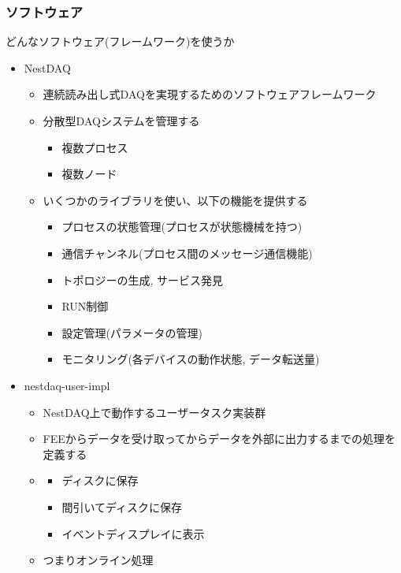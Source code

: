 \documentclass[../main.tex]{subfiles}
\begin{document}
\subsubsection{ソフトウェア}
どんなソフトウェア(フレームワーク)を使うか
\begin{tcolorbox}[
  title=執筆メモ,
  colback=yellow!8,
  colframe=black!30,
  breakable
]
\begin{itemize}
  \item NestDAQ
  \begin{itemize}
    \item 連続読み出し式DAQを実現するためのソフトウェアフレームワーク
    \item 分散型DAQシステムを管理する
    \begin{itemize}
      \item 複数プロセス
      \item 複数ノード
    \end{itemize}
    \item いくつかのライブラリを使い、以下の機能を提供する
    \begin{itemize}
      \item プロセスの状態管理(プロセスが状態機械を持つ)
      \item 通信チャンネル(プロセス間のメッセージ通信機能)
      \item トポロジーの生成, サービス発見
      \item RUN制御
      \item 設定管理(パラメータの管理)
      \item モニタリング(各デバイスの動作状態, データ転送量)
    \end{itemize}
  \end{itemize}
  \item nestdaq-user-impl
  \begin{itemize}
    \item NestDAQ上で動作するユーザータスク実装群
    \item FEEからデータを受け取ってからデータを外部に出力するまでの処理を定義する
    \item {}
    \begin{itemize}
      \item ディスクに保存
      \item 間引いてディスクに保存
      \item イベントディスプレイに表示
    \end{itemize}
    \item つまりオンライン処理

\end{itemize}
\end{itemize}
\end{tcolorbox}
\end{document}

